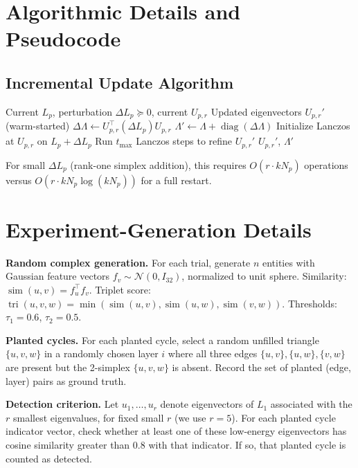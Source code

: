 \documentclass[11pt]{article}
\theoremstyle{definition}
\theoremstyle{remark}
\newcommand{\Up}{U_{p,r}}
\DeclareMathOperator{\diag}{diag}
\DeclareMathOperator{\simop}{sim}
\DeclareMathOperator{\tri}{tri}
\begin{document}
\clearpage
\section{Algorithmic Details and Pseudocode}
\label{app:algorithms}

\subsection{Incremental Update Algorithm}

\begin{algorithm}[h]
\caption{Incremental Supra-Hodge Spectral Update}
\label{alg:update}
\begin{algorithmic}[1]
\Require Current $L_p$, perturbation $\Delta L_p\succeq 0$, current $\Up$
\Ensure Updated eigenvectors $\Up'$ (warm-started)
\State $\Delta\Lambda \gets \Up^\top(\Delta L_p)\Up$ 
\State $\Lambda' \gets \Lambda + \diag(\Delta\Lambda)$ 
\State Initialize Lanczos at $\Up$ on $L_p+\Delta L_p$
\State Run $t_{\max}$ Lanczos steps to refine $\Up'$
\State \Return $\Up'$, $\Lambda'$
\end{algorithmic}
\end{algorithm}

For small $\Delta L_p$ (rank-one simplex addition), this requires $O(r\cdot kN_p)$
operations versus $O(r\cdot kN_p\log(kN_p))$ for a full restart.

\clearpage
\section{Experiment-Generation Details}
\label{app:experiments}

\textbf{Random complex generation.} For each trial, generate $n$ entities with
Gaussian feature vectors $f_v\sim\mathcal{N}(0,I_{32})$, normalized to unit sphere.
Similarity: $\simop(u,v)=f_u^\top f_v$. Triplet score:
$\tri(u,v,w)=\min(\simop(u,v),\simop(u,w),\simop(v,w))$. Thresholds:
$\tau_1=0.6$, $\tau_2=0.5$.

\textbf{Planted cycles.} For each planted cycle, select a random unfilled
triangle $\{u,v,w\}$ in a randomly chosen layer $i$ where all three edges
$\{u,v\},\{u,w\},\{v,w\}$ are present but the 2-simplex $\{u,v,w\}$ is absent.
Record the set of planted (edge, layer) pairs as ground truth.

\textbf{Detection criterion.} Let $u_1,\dots,u_r$ denote eigenvectors of $L_1$
associated with the $r$ smallest eigenvalues, for fixed small $r$ (we use $r=5$).
For each planted cycle indicator vector, check whether at least one of these
low-energy eigenvectors has cosine similarity greater than $0.8$ with that
indicator. If so, that planted cycle is counted as detected.
\end{document}

